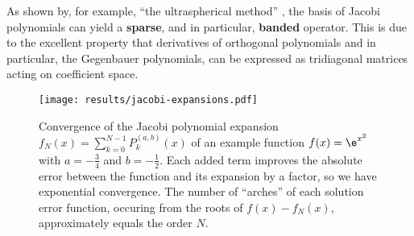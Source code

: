 As shown by, for example, ``the ultraspherical method'' \parencite{2013-a-fast-and-well-conditioned-spectral-method}, the basis of Jacobi polynomials can yield a \textbf{sparse}, and in particular, \textbf{banded} operator.
This is due to the excellent property that derivatives of orthogonal polynomials and in particular, the Gegenbauer polynomials, can be expressed as tridiagonal matrices acting on coefficient space.

\begin{figure}[H]
  \centering
  \texttt{[image: results/jacobi-expansions.pdf]}
  \caption[Convergence of Jacobi basis expansion]{Convergence of the Jacobi polynomial expansion $f_N(x) = \sum_{k=0}^{N-1} P_k^{(a, b)}(x)$ of an example function $f(x) = \e^{x^2}$ with $a = -\frac{3}{4}$ and $b = -\frac{1}{2}$. Each added term improves the absolute error between the function and its expansion by a factor, so we have exponential convergence. The number of ``arches'' of each solution error function, occuring from the roots of $f(x) - f_N(x)$, approximately equals the order $N$.}
  \label{fig:jacobi-expansions-error}
\end{figure}

